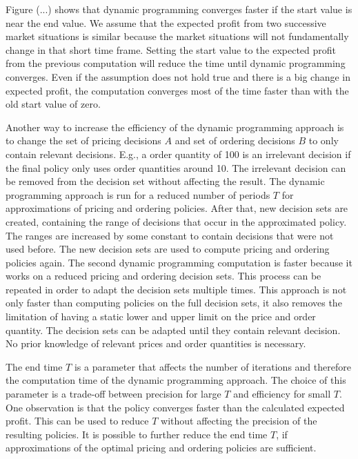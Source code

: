 Figure (...) shows that dynamic programming converges faster if the start value is near the end value.
We assume that the expected profit from two successive market situations is similar because the market situations will not fundamentally change in that short time frame.
Setting the start value to the expected profit from the previous computation will reduce the time until dynamic programming converges.
Even if the assumption does not hold true and there is a big change in expected profit, the computation converges most of the time faster than with the old start value of zero.

Another way to increase the efficiency of the dynamic programming approach is to change the set of pricing decisions $A$ and set of ordering decisions $B$ to only contain relevant decisions.
E.g., a order quantity of 100 is an irrelevant decision if the final policy only uses order quantities around 10.
The irrelevant decision can be removed from the decision set without affecting the result.
The dynamic programming approach is run for a reduced number of periods $T$ for approximations of pricing and ordering policies.
After that, new decision sets are created, containing the range of decisions that occur in the approximated policy.
The ranges are increased by some constant to contain decisions that were not used before.
The new decision sets are used to compute pricing and ordering policies again.
The second dynamic programming computation is faster because it works on a reduced pricing and ordering decision sets.
This process can be repeated in order to adapt the decision sets multiple times.
This approach is not only faster than computing policies on the full decision sets, it also removes the limitation of having a static lower and upper limit on the price and order quantity.
The decision sets can be adapted until they contain relevant decision.
No prior knowledge of relevant prices and order quantities is necessary.

The end time $T$ is a parameter that affects the number of iterations and therefore the computation time of the dynamic programming approach.
The choice of this parameter is a trade-off between precision for large $T$ and efficiency for small $T$.
One observation is that the policy converges faster than the calculated expected profit.
This can be used to reduce $T$ without affecting the precision of the resulting policies.
It is possible to further reduce the end time $T$, if approximations of the optimal pricing and ordering policies are sufficient.

